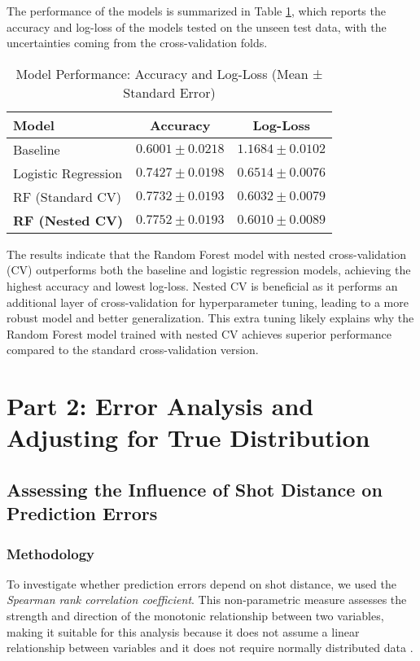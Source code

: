 \documentclass[fleqn,moreauthors,10pt]{ds_report}
\begin{document}
The performance of the models is summarized in Table \ref{tab:model_performance}, which reports the accuracy and log-loss of the models tested on the unseen test data, with the uncertainties coming from the cross-validation folds.

\begin{table}[h]
\centering
\caption{Model Performance: Accuracy and Log-Loss (Mean ± Standard Error)}
\begin{tabular}{|l|c|c|}
\hline
\textbf{Model} & \textbf{Accuracy} & \textbf{Log-Loss} \\ \hline
Baseline & \( 0.6001 \pm 0.0218 \) & \( 1.1684 \pm 0.0102 \) \\ \hline
Logistic Regression & \( 0.7427 \pm 0.0198 \) & \( 0.6514 \pm 0.0076 \) \\ \hline
RF (Standard CV) & \( 0.7732 \pm 0.0193 \) & \( 0.6032 \pm 0.0079 \) \\ \hline
\textbf{RF (Nested CV)} & \( \mathbf{0.7752 \pm 0.0193} \) & \( \mathbf{0.6010 \pm 0.0089} \) \\ \hline
\end{tabular}
\label{tab:model_performance}
\end{table}

The results indicate that the Random Forest model with nested cross-validation (CV) outperforms both the baseline and logistic regression models, achieving the highest accuracy and lowest log-loss. Nested CV is beneficial as it performs an additional layer of cross-validation for hyperparameter tuning, leading to a more robust model and better generalization. This extra tuning likely explains why the Random Forest model trained with nested CV achieves superior performance compared to the standard cross-validation version.

\section*{Part 2: Error Analysis and Adjusting for True Distribution}

\subsection*{Assessing the Influence of Shot Distance on Prediction Errors}

\subsubsection*{Methodology}
To investigate whether prediction errors depend on shot distance, we used the \textit{Spearman rank correlation coefficient}. This non-parametric measure assesses the strength and direction of the monotonic relationship between two variables, making it suitable for this analysis because it does not assume a linear relationship between variables and it does not require normally distributed data \cite{Corder2014Nonparametric}.
\end{document}
